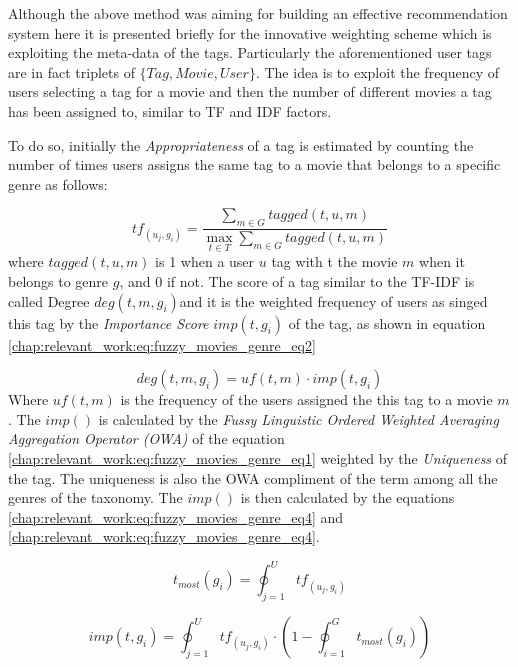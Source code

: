 Although the above method was aiming for building an effective recommendation system here it is presented briefly for the innovative weighting scheme which is exploiting the meta-data of the tags. Particularly the aforementioned user tags are in fact triplets of  $\{Tag, Movie, User \}$. The idea is to exploit the frequency of users selecting a tag for a movie and then the number of different movies a tag has been assigned to, similar to TF and IDF factors.

To do so, initially the \textit{Appropriateness} of a tag is estimated by counting the number of times users assigns the same tag to a movie that belongs to a specific genre as follows:

\begin{equation}\label{chap:relevant_work:eq:fuzzy_movies_genre_eq1}
	tf_(u_{j},g_{i}) = \frac{\sum_{m \in G} tagged(t,u,m) }{ \max_{t \in T} \sum_{m \in G} tagged(t,u,m)}
\end{equation}
where $tagged(t,u,m)$ is 1 when a user $u$ tag with t the movie $m$ when it belongs to genre $g$, and $0$ if not. The score of a tag similar to the TF-IDF is called Degree $deg(t,m,g_{i})$and it is the weighted frequency of users as singed this tag by the \textit{Importance Score} $imp(t,g_{i})$ of the tag, as shown in equation \ref{chap:relevant_work:eq:fuzzy_movies_genre_eq2}

\begin{equation}\label{chap:relevant_work:eq:fuzzy_movies_genre_eq2}
	deg(t,m,g_{i}) = uf(t,m) \cdot imp(t,g_{i})
\end{equation}
Where $uf(t,m)$ is the frequency of the users assigned the this tag to a movie $m$. The $imp()$ is calculated by the \textit{Fussy Linguistic Ordered Weighted Averaging Aggregation Operator (OWA)} of the equation \ref{chap:relevant_work:eq:fuzzy_movies_genre_eq1} weighted by the \textit{Uniqueness} of the tag. The uniqueness is also the OWA compliment of the term among all the genres of the taxonomy. The $imp()$ is then calculated by the equations \ref{chap:relevant_work:eq:fuzzy_movies_genre_eq4} and \ref{chap:relevant_work:eq:fuzzy_movies_genre_eq4}.

\begin{equation}\label{chap:relevant_work:eq:fuzzy_movies_genre_eq3}
	t_{most}(g_{i}) = \oint_{j=1}^{U} tf_(u_{j},g_{i})
\end{equation}

\begin{equation}\label{chap:relevant_work:eq:fuzzy_movies_genre_eq4}
	imp(t,g_{i}) = \oint_{j=1}^{U} tf_(u_{j},g_{i}) \cdot (1 -  \oint_{i=1}^{G} t_{most}(g_{i}))
\end{equation}

